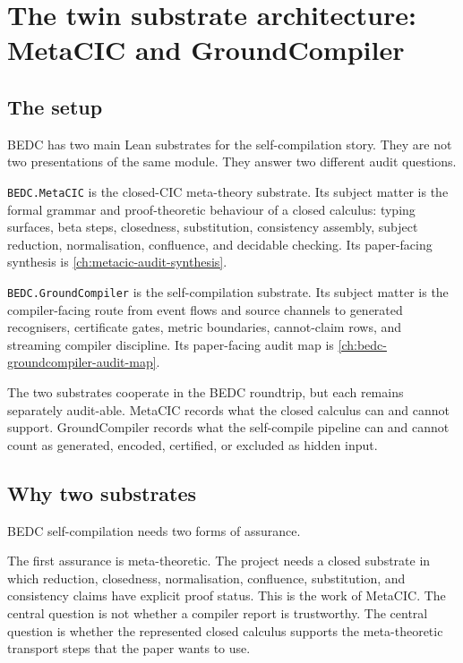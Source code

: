\chapter{The twin substrate architecture: MetaCIC and GroundCompiler}
\label{ch:twin-substrate-synthesis}

\section{The setup}
\label{sec:twin-substrate-synthesis-setup}

BEDC has two main Lean substrates for the self-compilation story.
They are not two presentations of the same module. They answer two
different audit questions.

\texttt{BEDC.MetaCIC} is the closed-CIC meta-theory substrate. Its
subject matter is the formal grammar and proof-theoretic behaviour of a
closed calculus: typing surfaces, beta steps, closedness, substitution,
consistency assembly, subject reduction, normalisation, confluence, and
decidable checking. Its paper-facing synthesis is
\autoref{ch:metacic-audit-synthesis}.

\texttt{BEDC.GroundCompiler} is the self-compilation substrate. Its subject
matter is the compiler-facing route from event flows and source channels to
generated recognisers, certificate gates, metric boundaries, cannot-claim
rows, and streaming compiler discipline. Its paper-facing audit map is
\autoref{ch:bedc-groundcompiler-audit-map}.

The two substrates cooperate in the BEDC roundtrip, but each remains
separately audit-able. MetaCIC records what the closed calculus can and
cannot support. GroundCompiler records what the self-compile pipeline can and
cannot count as generated, encoded, certified, or excluded as hidden input.

\section{Why two substrates}
\label{sec:twin-substrate-synthesis-why-two}

BEDC self-compilation needs two forms of assurance.

The first assurance is meta-theoretic. The project needs a closed substrate in
which reduction, closedness, normalisation, confluence, substitution, and
consistency claims have explicit proof status. This is the work of MetaCIC.
The central question is not whether a compiler report is trustworthy. The
central question is whether the represented closed calculus supports the
meta-theoretic transport steps that the paper wants to use.

